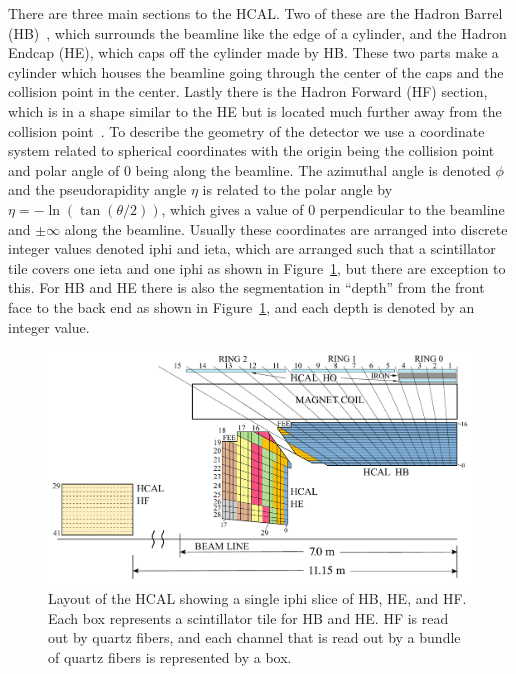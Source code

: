 There are three main sections to the HCAL. Two of these are the Hadron Barrel (HB)~\cite{HB}, which surrounds the beamline like the edge of a cylinder, and the Hadron Endcap (HE), which caps off the cylinder made by HB. These two parts make a cylinder which houses the beamline going through the center of the caps and the collision point in the center. Lastly there is the Hadron Forward (HF) section, which is in a shape similar to the HE but is located much further away from the collision point~\cite{HF}. To describe the geometry of the detector we use a coordinate system related to spherical coordinates with the origin being the collision point and polar angle of 0 being along the beamline. The azimuthal angle is denoted $\phi$ and the pseudorapidity angle $\eta$ is related to the polar angle by $\eta = -\ln(\tan(\theta/2))$, which gives a value of 0 perpendicular to the beamline and $\pm\infty$ along the beamline. Usually these coordinates are arranged into discrete integer values denoted iphi and ieta, which are arranged such that a scintillator tile covers one ieta and one iphi as shown in Figure~\ref{fig:Depth}, but there are exception to this. For HB and HE there is also the segmentation in ``depth'' from the front face to the back end as shown in Figure~\ref{fig:Depth}, and each depth is denoted by an integer value. 


\begin{figure}
\centering
\includegraphics[width=\linewidth]{Figures/Depthsegmentation.pdf}
\caption{Layout of the HCAL showing a single iphi slice of HB, HE, and HF. Each box represents a scintillator tile for HB and HE. HF is read out by quartz fibers, and each channel that is read out by a bundle of quartz fibers is represented by a box.}
\label{fig:Depth}
\end{figure}

